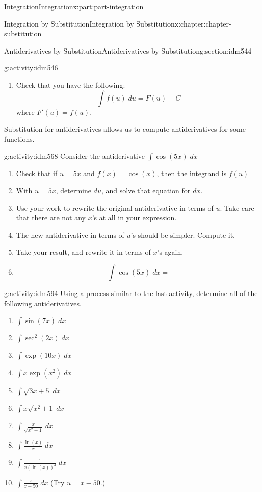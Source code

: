 \documentclass[oneside,10pt,]{book}
\numberwithin{equation}{section}
\begin{document}
\begin{partptx}{Integration}{}{Integration}{}{}{x:part:part-integration}
\begin{chapterptx}{Integration by Substitution}{}{Integration by Substitution}{}{}{x:chapter:chapter-substitution}
\begin{sectionptx}{Antiderivatives by Substitution}{}{Antiderivatives by Substitution}{}{}{g:section:idm544}
\begin{activity}{}{g:activity:idm546}
\begin{enumerate}[font=\bfseries,label=(\alph*),ref=\alph*]
\item{}Check that you have the following:%
\begin{equation*}
\int f(u)\;du = F(u) + C
\end{equation*}
where \(F'(u) = f(u)\).%
\end{enumerate}
\end{activity}
Substitution for antiderivatives allows us to compute antiderivatives for some functions.%
\begin{activity}{}{g:activity:idm568}%
Consider the antiderivative \(\displaystyle \int \cos(5x)\;dx\)%
\begin{enumerate}[font=\bfseries,label=(\alph*),ref=\alph*]
\item{}Check that if \(u = 5x\) and \(f(x) = \cos(x)\), then the integrand is \(f(u)\)%
\item{}With \(u = 5x\), determine \(du\), and solve that equation for \(dx\).%
\item{}Use your work to rewrite the original antiderivative in terms of \(u\). Take care that there are not any \(x\)'s at all in your expression.%
\item{}The new antiderivative in terms of \(u\)'s should be simpler. Compute it.%
\item{}Take your result, and rewrite it in terms of \(x\)'s again.%
\item{}%
\begin{equation*}
\int \cos(5x)\;dx = 
\end{equation*}
\end{enumerate}
\end{activity}
\begin{activity}{}{g:activity:idm594}%
Using a process similar to the last activity, determine all of the following antiderivatives.%
\begin{enumerate}[font=\bfseries,label=(\alph*),ref=\alph*]
\item{}\(\displaystyle\int \sin(7x)\;dx\)\item{}\(\displaystyle\int \sec^2(2x)\;dx\)\item{}\(\displaystyle\int \exp(10x)\;dx\)\item{}\(\displaystyle\int x\exp(x^2)\;dx\)\item{}\(\displaystyle\int \sqrt{3x+5}\;dx\)\item{}\(\displaystyle\int x\sqrt{x^2+1}\;dx\)\item{}\(\displaystyle\int \frac{x}{\sqrt{x^2+1}}\;dx\)\item{}\(\displaystyle\int \frac{\ln(x)}{x}\;dx\)\item{}\(\displaystyle\int \frac{1}{x(\ln(x))^2}\;dx\)\item{}\(\displaystyle\int \frac{x}{x-50}\;dx\) (Try \(u=x-50\).)\end{enumerate}

\end{activity}
\end{sectionptx}
\end{chapterptx}
\end{partptx}
\end{document}
